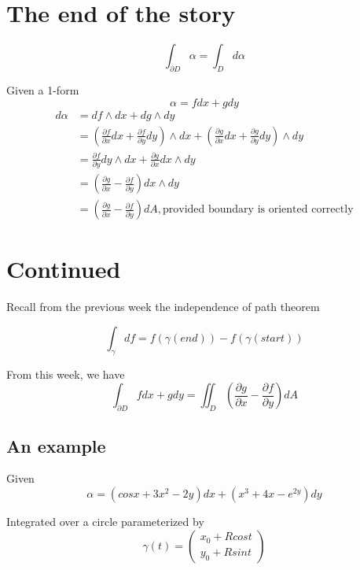 \section{The end of the story}

\[
  \int_{\partial D}^{}  \alpha = \int_{D}^{} d\alpha  
\] 

Given a 1-form
\[
  \alpha = fdx + g dy
\] 
\begin{align*}
   d\alpha &= df \wedge dx + dg \wedge dy \\
           &= \left( \frac{\partial f}{\partial x}dx + \frac{\partial f}{\partial y}dy \right)  \wedge dx  + \left( \frac{\partial g}{\partial x} dx + \frac{\partial g}{\partial y}dy \right) \wedge dy \\
           &= \frac{\partial f}{\partial y} dy \wedge dx + \frac{\partial g}{\partial x} dx \wedge dy \\
           &= \left(   \frac{\partial g}{\partial x} - \frac{\partial f}{\partial y} \right) dx \wedge dy  \\
           &= \left(   \frac{\partial g}{\partial x} - \frac{\partial f}{\partial y} \right) dA , \text{provided boundary is oriented correctly}
\end{align*}


\section{Continued}

Recall from the previous week the independence of path theorem

\[
  \int_{\gamma}^{ } df = f(\gamma(end)) - f \left(  \gamma \left( start \right)  \right)  
\] 

From this week, we have
\[
   \int_{\partial D}^{} fdx + gdy = \iint_{D}  \left( \frac{\partial g}{\partial x} - \frac{\partial f}{\partial y}  \right) dA 
\] 

\subsection{An example}

Given \[
   \alpha = \left( cos x + 3x^2 - 2y \right) dx + \left( x^3 + 4x - e^{2y} \right) dy
\] 

Integrated over a circle parameterized by
\[
   \gamma(t) = \begin{pmatrix} x_0 + Rcost \\ y_0 + Rsint \end{pmatrix}
\]

